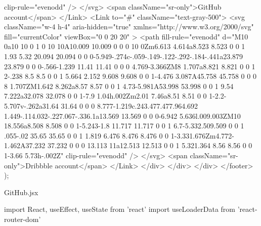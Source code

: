 {                                                        clip-rule="evenodd"
                                                    />
                                                </svg>
                                                <span className="sr-only">GitHub account</span>
                                            </Link>
                                            <Link to="#" className="text-gray-500">
                                                <svg
                                                    className="w-4 h-4"
                                                    aria-hidden="true"
                                                    xmlns="http://www.w3.org/2000/svg"
                                                    fill="currentColor"
                                                    viewBox="0 0 20 20"
                                                >
                                                    <path
                                                        fill-rule="evenodd"
                                                        d="M10 0a10 10 0 1 0 10 10A10.009 10.009 0 0 0 10 0Zm6.613 4.614a8.523 8.523 0 0 1 1.93 5.32 20.094 20.094 0 0 0-5.949-.274c-.059-.149-.122-.292-.184-.441a23.879 23.879 0 0 0-.566-1.239 11.41 11.41 0 0 0 4.769-3.366ZM8 1.707a8.821 8.821 0 0 1 2-.238 8.5 8.5 0 0 1 5.664 2.152 9.608 9.608 0 0 1-4.476 3.087A45.758 45.758 0 0 0 8 1.707ZM1.642 8.262a8.57 8.57 0 0 1 4.73-5.981A53.998 53.998 0 0 1 9.54 7.222a32.078 32.078 0 0 1-7.9 1.04h.002Zm2.01 7.46a8.51 8.51 0 0 1-2.2-5.707v-.262a31.64 31.64 0 0 0 8.777-1.219c.243.477.477.964.692 1.449-.114.032-.227.067-.336.1a13.569 13.569 0 0 0-6.942 5.636l.009.003ZM10 18.556a8.508 8.508 0 0 1-5.243-1.8 11.717 11.717 0 0 1 6.7-5.332.509.509 0 0 1 .055-.02 35.65 35.65 0 0 1 1.819 6.476 8.476 8.476 0 0 1-3.331.676Zm4.772-1.462A37.232 37.232 0 0 0 13.113 11a12.513 12.513 0 0 1 5.321.364 8.56 8.56 0 0 1-3.66 5.73h-.002Z"
                                                        clip-rule="evenodd"
                                                    />
                                                </svg>
                                                <span className="sr-only">Dribbble account</span>
                                            </Link>
                                        </div>
                                    </div>
                                </div>
                            </footer>
                        );
                    }

GitHub.jsx

                    import React, { useEffect, useState } from 'react'
                    import { useLoaderData } from 'react-router-dom'

